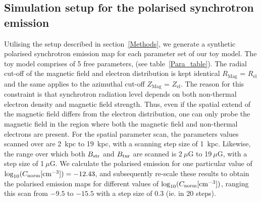 \documentclass[usenatbib]{mnras}
\newcommand{\Andrew}[1]{\textcolor{dg}{#1}}
\newcommand{\Vasu}[1]{{\color{purple}#1}}
\begin{document}
\subsection{Simulation setup for the polarised synchrotron emission}

Utilising the setup described in section~\ref{Methods}, we generate a synthetic polarised synchrotron emission map for each parameter set of our toy model. The toy model comprises of 5 free parameters, (see table~\ref{Para_table}). The radial cut-off of the magnetic field and electron distribution is kept identical $R_{\mathrm{Mag}}$ = $R_{\mathrm{el}}$ and the same applies to the azimuthal cut-off $Z_{\mathrm{Mag}}$ = $Z_{\mathrm{el}}$. The reason for this constraint is that synchrotron radiation level depends on both non-thermal electron density and magnetic field strength. Thus, even if the spatial extend of the magnetic field differs from the electron distribution, one can only probe the magnetic field in the region where both the magnetic field and non-thermal electrons are present. For the spatial parameter scan, the parameters values scanned over are 2~kpc to 19~kpc, with a scanning step size of 1~kpc. Likewise, the range over which both $B_{\rm str}$ and $B_{\rm tur}$ are scanned is 2$~\mu$G to 19$~\mu$G, with a step size of 1$~\mu$G. We calculate the polarised emission for one particular value of $\log_{10}(C_{\rm norm}[{\rm cm}^{-3}]) = -12.43$, and subsequently re-scale these results to obtain the polarised emission maps for different values of  $\log_{10}(C_{\rm norm} [{\rm cm}^{-3}])$, ranging this scan from $-9.5$ to $-15.5$ with a step size of $0.3$ (ie. in 20 steps).%
\end{document}
